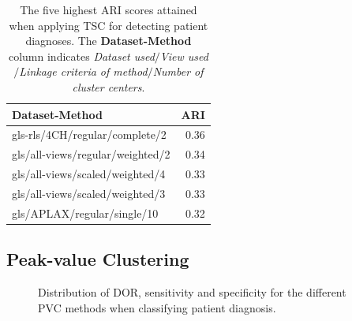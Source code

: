 \begin{table}
    \centering
    \begin{tabular}{lr}
        \toprule
        Dataset-Method                   &  ARI \\
        \midrule
        gls-rls/4CH/regular/complete/2   & 0.36 \\
        gls/all-views/regular/weighted/2 & 0.34 \\
        gls/all-views/scaled/weighted/4  & 0.33 \\
        gls/all-views/scaled/weighted/3  & 0.33 \\
        gls/APLAX/regular/single/10      & 0.32 \\
        \bottomrule
    \end{tabular}
    \caption{The five highest ARI scores attained when applying TSC for detecting patient diagnoses.
             The \textbf{Dataset-Method} column indicates \textit{Dataset used}$/$\textit{View used}$/$\textit{Linkage criteria of method}$/$\textit{Number of cluster centers}.}
    \label{tab:tsc_ind_ari}
\end{table}

%     

\newpage

\subsection{Peak-value Clustering}

\begin{figure}[htb]
    \centering
    
    \caption{Distribution of DOR, sensitivity and specificity for the different PVC methods when classifying patient diagnosis.}
    \label{fig:pvc_ind_dor_sens_spec_dist}
\end{figure}


